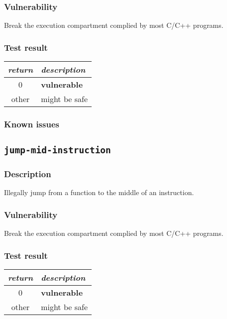 \documentclass[a4paper]{book}
\begin{document}
\subsubsection{Vulnerability}
Break the execution compartment complied by most C/C++ programs.

\subsubsection{Test result}
\begin{tabular}{cl}
  \toprule
  \emph{return}  & \emph{description} \\
  \midrule
  0              & \textbf{vulnerable} \\
  other          & might be safe \\
  \bottomrule
\end{tabular}
  
\subsubsection{Known issues}



\newpage
\subsection{\texttt{jump-mid-instruction}}\label{test-jump-mid-instruction}

\subsubsection{Description}
Illegally jump from a function to the middle of an instruction.

\subsubsection{Vulnerability}
Break the execution compartment complied by most C/C++ programs.

\subsubsection{Test result}
\begin{tabular}{cl}
  \toprule
  \emph{return}  & \emph{description} \\
  \midrule
  0              & \textbf{vulnerable} \\
  other          & might be safe \\
  \bottomrule
\end{tabular}
  
\end{document}
